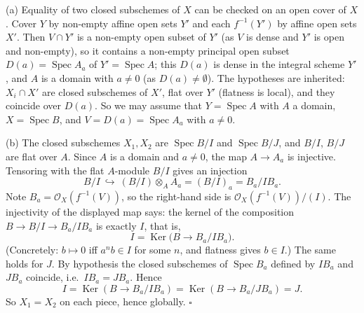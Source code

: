 \documentclass[11pt]{article}
\begin{document}
\pf
(a) Equality of two closed subschemes of $X$ can be checked on an open cover of $X$. Cover $Y$ by non-empty affine open sets $Y'$ and each $f^{-1}(Y')$ by affine open sets $X'$. Then $V\cap Y'$ is a non-empty open subset of $Y'$ (as $V$ is dense and $Y'$ is open and non-empty), so it contains a non-empty principal open subset $D(a)=\operatorname{Spec}A_a$ of $Y'=\operatorname{Spec}A$; this $D(a)$ is dense in the integral scheme $Y'$, and $A$ is a domain with $a\ne0$ (as $D(a)\ne\emptyset$). The hypotheses are inherited: $X_i\cap X'$ are closed subschemes of $X'$, flat over $Y'$ (flatness is local), and they coincide over $D(a)$. So we may assume that $Y=\operatorname{Spec}A$ with $A$ a domain, $X=\operatorname{Spec}B$, and $V=D(a)=\operatorname{Spec}A_a$ with $a\ne0$.

(b) The closed subschemes $X_1,X_2$ are $\operatorname{Spec}B/I$ and $\operatorname{Spec}B/J$, and $B/I$, $B/J$ are flat over $A$. Since $A$ is a domain and $a\ne0$, the map $A\to A_a$ is injective. Tensoring with the flat $A$-module $B/I$ gives an injection
\[ B/I\ \hookrightarrow\ (B/I)\otimes_AA_a=(B/I)_a=B_a/IB_a . \]
Note $B_a=\mathcal O_X(f^{-1}(V))$, so the right-hand side is $\mathcal O_X(f^{-1}(V))/(I)$. The injectivity of the displayed map says: the kernel of the composition $B\to B/I\to B_a/IB_a$ is exactly $I$, that is,
\[ I=\operatorname{Ker}\bigl(B\to B_a/IB_a\bigr). \]
(Concretely: $b\mapsto0$ iff $a^nb\in I$ for some $n$, and flatness gives $b\in I$.) The same holds for $J$. By hypothesis the closed subschemes of $\operatorname{Spec}B_a$ defined by $IB_a$ and $JB_a$ coincide, i.e.\ $IB_a=JB_a$. Hence
\[ I=\operatorname{Ker}(B\to B_a/IB_a)=\operatorname{Ker}(B\to B_a/JB_a)=J. \]
So $X_1=X_2$ on each piece, hence globally. \hfill$\square$
\end{document}
